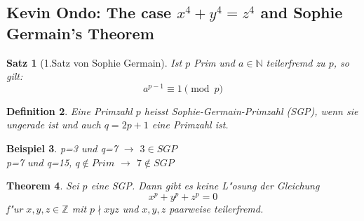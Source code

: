 \documentclass[12pt, a4paper, twoside]{article}
\newtheorem{satz}{Satz}
\newtheorem{defi}[satz]{Definition}
\newtheorem{bsp}[satz]{Beispiel}
\newtheorem{thm}[satz]{Theorem}
\numberwithin{equation}{section}
\begin{document}
\subsection{Kevin Ondo: The case $x^4+y^4=z^4$ and Sophie Germain's Theorem}
\begin{satz}[1.Satz von Sophie Germain]
Ist $p$ Prim und $a \in \mathbb{N}$ teilerfremd zu $p$, so gilt:\\
$$a^{p-1} \equiv 1 \pmod  p$$
\end{satz}
\begin{defi}
Eine Primzahl $p$ heisst Sophie-Germain-Primzahl (SGP), wenn sie ungerade ist und auch $q=2p+1$ eine Primzahl ist.
\end{defi}
\begin{bsp}
p=3 und q=7 $\rightarrow$ $3 \in SGP$\\
p=7 und q=15, $q \notin Prim$ $\rightarrow$ $7 \notin SGP$
\end{bsp}
\begin{thm}
Sei $p$  eine SGP. Dann gibt es keine L"osung der Gleichung $$x^p+y^p+z^p=0$$ f"ur $x,y,z \in\mathbb{Z}$ mit $p\nmid xyz$ und $x,y,z$ paarweise teilerfremd.
\end{thm}
\end{document}
